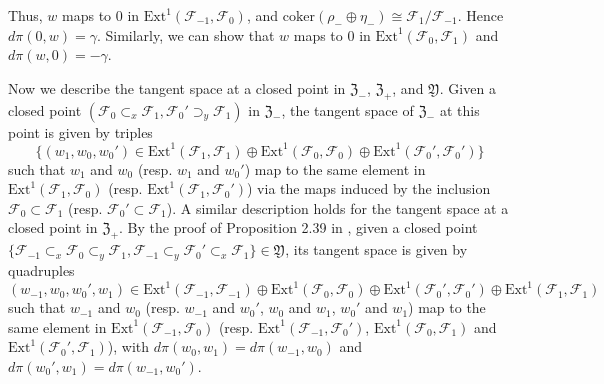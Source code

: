 \documentclass{amsart}
\numberwithin{equation}{section}
\newcommand\mc{\mathcal}
\newcommand\mf{\mathfrak}
\theoremstyle{definition}
\theoremstyle{remark}
\begin{document}
Thus, $w$ maps to $0$ in $\mathrm{Ext}^1(\mc{F}_{-1},\mc{F}_0)$, and $\mathrm{coker}(\rho_-\oplus \eta_-
)\cong \mc{F}_{1}/\mc{F}_{-1}$. Hence $d\pi(0,w)=\gamma$. Similarly, we can show that $w$ maps to $0$ in $\mathrm{Ext}^1(\mc{F}_0,\mc{F}_1)$ and $d\pi(w,0)=-\gamma$.
 
  
  
Now we describe the tangent space at a closed point in $\mf{Z}_{-}$, $\mf{Z}_{+}$, and $\mf{Y}$. Given a closed point $(\mc{F}_{0}\subset_{x} \mc{F}_{1}, \mc{F}_{0}'\supset_{y} \mc{F}_{1})$ in $\mf{Z}_{-}$, the tangent space of $\mf{Z}_{-}$ at this point is given by triples 
\begin{equation*}
  \{(w_{1},w_{0},w_{0}')\in \mathrm{Ext}^1(\mc{F}_{1},\mc{F}_{1})\oplus \mathrm{Ext}^1(\mc{F}_{0},\mc{F}_{0})\oplus \mathrm{Ext}^1(\mc{F}_{0}',\mc{F}_{0}')\}
\end{equation*}
such that $w_{1}$ and $w_{0}$ (resp. $w_{1}$ and $w_{0}'$) map to the same element in $\mathrm{Ext}^1(\mc{F}_{1},\mc{F}_{0})$ (resp. $\mathrm{Ext}^1(\mc{F}_{1},\mc{F}_{0}')$) via the maps induced by the inclusion $\mc{F}_{0}\subset \mc{F}_{1}$ (resp. $\mc{F}_{0}'\subset \mc{F}_{1}$). A similar description holds for the tangent space at a closed point in $\mf{Z}_{+}$. By the proof of Proposition 2.39 in \cite{neguct2018hecke}, given a closed point $\{\mc{F}_{-1}\subset_{x}\mc{F}_0\subset_{y} \mc{F}_1, \mc{F}_{-1}\subset_{y}\mc{F}_0'\subset_{x} \mc{F}_1\}\in \mf{Y}$, its tangent space is given by quadruples 
  \begin{equation*}
    (w_{-1},w_{0},w_{0}',w_{1})\in \mathrm{Ext}^1(\mc{F}_{-1},\mc{F}_{-1})\oplus \mathrm{Ext}^1(\mc{F}_{0},\mc{F}_{0})\oplus \mathrm{Ext}^1(\mc{F}_{0}',\mc{F}_{0}')\oplus \mathrm{Ext}^1(\mc{F}_{1},\mc{F}_{1})
  \end{equation*}
  such that $w_{-1}$ and $w_{0}$ (resp. $w_{-1}$ and $w_0'$, $w_0$ and $w_1$, $w_0'$ and $w_1$) map to the same element in $\mathrm{Ext}^1(\mc{F}_{-1},\mc{F}_{0})$ (resp. $\mathrm{Ext}^1(\mc{F}_{-1},\mc{F}_0')$, $\mathrm{Ext}^1(\mc{F}_{0},\mc{F}_1)$ and $\mathrm{Ext}^1(\mc{F}_0',\mc{F}_1)$), with
  $d\pi(w_0,w_1)=d\pi(w_{-1},w_0)$ and $d\pi(w_0',w_1)=d\pi(w_{-1},w_0')$.
\end{document}
